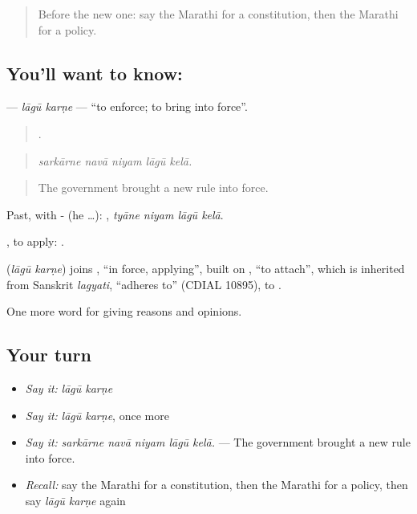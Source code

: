 \label{lesson:MR-C358-lagu-karne}



\begin{quote}
Before the new one: say the Marathi for a constitution, then the Marathi for a policy.
\end{quote}

\subsection*{You'll want to know:  }
\textbf{ } — \emph{lāgū karṇe} — \textquotedblleft{}to enforce; to bring into force\textquotedblright{}.

\begin{quote}
    .
\end{quote}

\begin{quote}
\emph{sarkārne navā niyam lāgū kelā.}
\end{quote}

\begin{quote}
The government brought a new rule into force.
\end{quote}

Past, with - (he …):    , \emph{tyāne niyam lāgū kelā}.

 , to apply:     .

\begin{cousinweb}
\textbf{ } (\emph{lāgū karṇe}) joins , \textquotedblleft{}in force, applying\textquotedblright{}, built on , \textquotedblleft{}to attach\textquotedblright{}, which is inherited from Sanskrit \emph{lagyati}, \textquotedblleft{}adheres to\textquotedblright{} (CDIAL 10895), to .
\end{cousinweb}

\begin{grammarlens}[title={What you've built}]
One more word for giving reasons and opinions.
\end{grammarlens}

\subsection*{Your turn}
\begin{itemize}
\raggedright
  \item \emph{Say it:} \emph{lāgū karṇe}
  \item \emph{Say it:} \emph{lāgū karṇe}, once more
  \item \emph{Say it:} \emph{sarkārne navā niyam lāgū kelā.} — The government brought a new rule into force.
  \item \emph{Recall:} say the Marathi for a constitution, then the Marathi for a policy, then say \emph{lāgū karṇe} again
\end{itemize}

